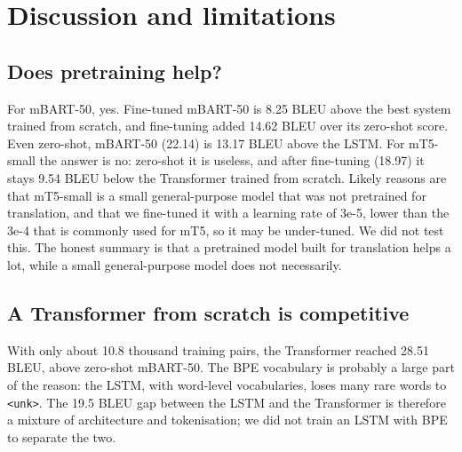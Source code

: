 \documentclass[11pt,a4paper]{article}
\begin{document}
\section{Discussion and limitations}
\subsection{Does pretraining help?}
For mBART-50, yes. Fine-tuned mBART-50 is 8.25 BLEU above the best system trained from scratch, and fine-tuning added 14.62 BLEU over its zero-shot score. Even zero-shot, mBART-50 (22.14) is 13.17 BLEU above the LSTM. For mT5-small the answer is no: zero-shot it is useless, and after fine-tuning (18.97) it stays 9.54 BLEU below the Transformer trained from scratch. Likely reasons are that mT5-small is a small general-purpose model that was not pretrained for translation, and that we fine-tuned it with a learning rate of 3e-5, lower than the 3e-4 that is commonly used for mT5, so it may be under-tuned. We did not test this. The honest summary is that a pretrained model built for translation helps a lot, while a small general-purpose model does not necessarily.

\subsection{A Transformer from scratch is competitive}
With only about 10.8 thousand training pairs, the Transformer reached 28.51 BLEU, above zero-shot mBART-50. The BPE vocabulary is probably a large part of the reason: the LSTM, with word-level vocabularies, loses many rare words to \texttt{\textless{}unk\textgreater{}}. The 19.5 BLEU gap between the LSTM and the Transformer is therefore a mixture of architecture and tokenisation; we did not train an LSTM with BPE to separate the two.
\end{document}
